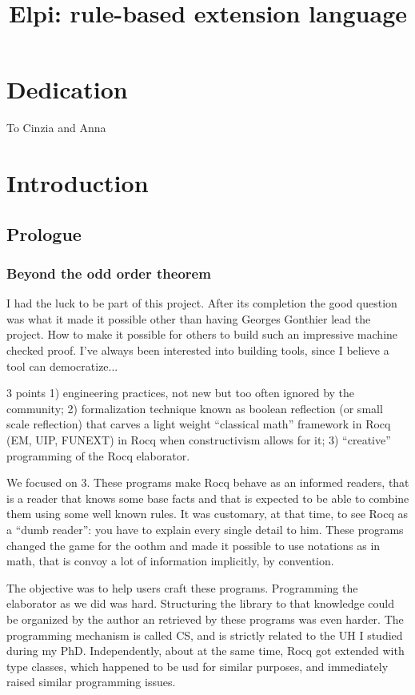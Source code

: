 \documentclass[a4paper, 11pt]{book}
\title{Elpi: rule-based extension language}
\newenvironment{dedication}
  {%
   \thispagestyle{empty}%
   \vspace*{\stretch{1}}%
   \itshape             %
   \raggedleft          %
  }
  {\par %
   \vspace{\stretch{3}} %
   \clearpage           %
  }
\begin{document}
\maketitle
\chapter*{Dedication}
\begin{dedication}
To Cinzia and Anna
\end{dedication}

\setcounter{tocdepth}{5}
\tableofcontents

 \chapter{Introduction}


\section{Prologue}

\subsection{Beyond the odd order theorem}

I had the luck to be part of this project.
After its completion the good question was what it made it possible
other than having Georges Gonthier lead the project. How to make
it possible for others to build such an impressive machine checked
proof. I've always been interested into building tools, since I believe
a tool can democratize...

3 points 1) engineering practices, not new but too often
ignored by the community; 2) formalization technique known as boolean
reflection (or small scale reflection) that carves a light weight
``classical math'' framework in Rocq (EM, UIP, FUNEXT) in Rocq when
constructivism allows for it; 3) ``creative'' programming of the
Rocq elaborator.

We focused on 3. These programs make Rocq behave as an informed readers,
that is a reader that knows some base facts and that is expected to
be able to combine them using some well known rules. It was customary,
at that time, to see Rocq as a ``dumb reader'': you have to explain
every single detail to him. These programs changed the game  for the
oothm and made it possible to use notations as in math, that is convoy
a lot of information implicitly, by convention.

The objective was to help users craft these programs. Programming
the elaborator as we did was hard. Structuring the library to that
knowledge could be organized by the author an retrieved by these
programs was even harder. The programming mechanism is called CS,
and is strictly related to the UH I studied during my PhD.
Independently, about at the same time,
Rocq got extended with type classes, which happened to be usd for similar
purposes, and immediately raised similar programming issues.
\end{document}
